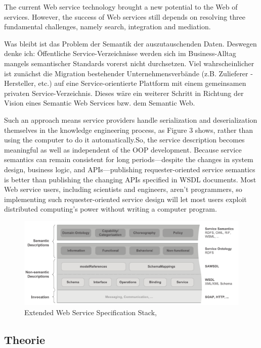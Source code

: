 The current Web service technology brought a new potential
to the Web of services. However, the success of Web
services still depends on resolving three fundamental challenges,
namely search, integration and mediation. \cite{WSMOLITE}

Was bleibt ist das Problem der Semantik der auszutauschenden Daten. Deswegen denke ich: Öffentliche Service-Verzeichnisse werden sich im Business-Alltag mangels semantischer Standards vorerst nicht durchsetzen. Viel wahrscheinlicher ist zunächst die Migration bestehender Unternehmensverbände (z.B. Zulieferer - Hersteller, etc.) auf eine Service-orientierte Plattform mit einem gemeinsamen privaten Service-Verzeichnis. Dieses wäre ein weiterer Schritt in Richtung der Vision eines Semantic Web Services bzw. dem Semantic Web.  \cite{hhxmlwssoa} 

Such an approach means service providers handle serialization
and deserialization themselves in the knowledge
engineering process, as Figure 3 shows, rather than using
the computer to do it automatically.So, the service description
becomes meaningful as well as independent of the
OOP development.
Because service semantics can remain consistent for long
periods—despite the changes in system design, business
logic, and APIs—publishing requester-oriented service
semantics is better than publishing the changing APIs specified
in WSDL documents. Most Web service users, including
scientists and engineers, aren’t programmers, so
implementing such requester-oriented service design will
let most users exploit distributed computing’s power without
writing a computer program. \cite{shi1}

\begin{figure}
\includegraphics[width=14cm]{media/Extended-Web-Service-Specification-Stack.pdf}
\caption{Extended Web Service Specification Stack, \cite{WSMOLITE}}
\end{figure}

\subsection{Theorie}

